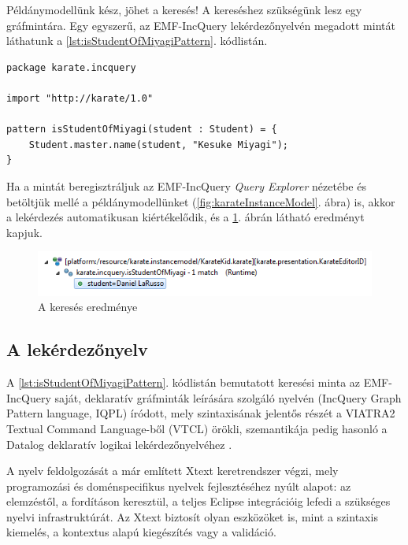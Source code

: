 Példánymodellünk kész, jöhet a keresés!
A kereséshez szükségünk lesz egy gráfmintára.
Egy egyszerű, az EMF-IncQuery lekérdezőnyelvén megadott mintát láthatunk a \ref{lst:isStudentOfMiyagiPattern}. kódlistán.
%
\begin{lstlisting}[float,floatplacement=htb,caption=isStudentOfMiyagi gráfminta a tárgynyelven,label=lst:isStudentOfMiyagiPattern]
package karate.incquery

import "http://karate/1.0"

pattern isStudentOfMiyagi(student : Student) = {
    Student.master.name(student, "Kesuke Miyagi");
}
\end{lstlisting}
%
Ha a mintát beregisztráljuk az EMF-IncQuery \emph{Query Explorer} nézetébe és betöltjük mellé a példánymodellünket (\ref{fig:karateInstanceModel}. ábra) is, akkor a lekérdezés automatikusan kiértékelődik, és a \ref{fig:karateQueryResult}. ábrán látható eredményt kapjuk.
%
\begin{figure}[htb]
\centering
\includegraphics[width=\textwidth]{figures/karate-query-result.png}
\caption{A keresés eredménye}
\label{fig:karateQueryResult}
\end{figure}

\subsection{A lekérdezőnyelv}

A \ref{lst:isStudentOfMiyagiPattern}. kódlistán bemutatott keresési minta az EMF-IncQuery saját, deklaratív gráfminták leírására szolgáló nyelvén (IncQuery Graph Pattern language, IQPL) íródott, mely szintaxisának jelentős részét a VIATRA2 Textual Command Language-ből (VTCL) örökli, szemantikája pedig hasonló a Datalog deklaratív logikai lekérdezőnyelvéhez \cite{Ceri:1989:YAW:627272.627357}.

A nyelv feldolgozását a már említett Xtext keretrendszer végzi, mely programozási és doménspecifikus nyelvek fejlesztéséhez nyúlt alapot: az elemzéstől, a fordításon keresztül, a teljes Eclipse integrációig lefedi a szükséges nyelvi infrastruktúrát.
Az Xtext biztosít olyan eszközöket is, mint a szintaxis kiemelés, a kontextus alapú kiegészítés vagy a validáció.

